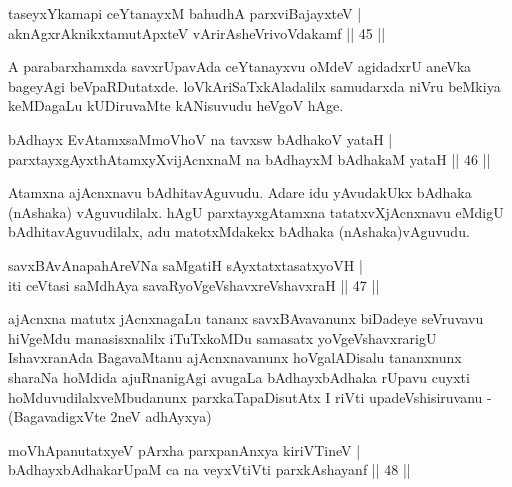 \begin{shl}
taseyxYkamapi ceYtanayxM bahudhA parxviBajayxteV |\\
aknAgxrAknikxtamutApxteV vArirAsheVrivoVdakamf \hfill || 45 ||
\end{shl}

\begin{artha}
A parabarxhamxda savxrUpavAda ceYtanayxvu oMdeV agidadxrU aneVka bageyAgi beVpaRDutatxde. loVkAriSaTxkAladalilx samudarxda niVru beMkiya keMDagaLu kUDiruvaMte kANisuvudu heVgoV hAge.
\end{artha}


\begin{shl}
bAdhayx EvA\s \s tamxsaMmoVhoV na tavxsw bAdhakoV yataH |\\
parxtayxgAyxthAtamxyXvijAcnxnaM na bAdhayxM bAdhakaM yataH \hfill || 46 ||
\end{shl}

\begin{artha}
Atamxna ajAcnxnavu bAdhitavAguvudu. Adare idu yAvudakUkx bAdhaka (nAshaka) vAguvudilalx. hAgU parxtayxgAtamxna tatatxvXjAcnxnavu eMdigU bAdhitavAguvudilalx, adu matotxMdakekx bAdhaka (nAshaka)vAguvudu.
\end{artha}

\begin{shl}
savxBAvAnapahAreVNa saMgatiH sAyxtatxtasatxyoVH |\\
iti ceVtasi saMdhAya savaRyoVgeVshavxreVshavxraH \hfill || 47 ||
\end{shl}

\begin{artha}
ajAcnxna matutx jAcnxnagaLu tananx savxBAvavanunx biDadeye seVruvavu hiVgeMdu manasisxnalilx iTuTxkoMDu samasatx yoVgeVshavxrarigU IshavxranAda BagavaMtanu ajAcnxnavanunx hoVgalADisalu tananxnunx sharaNa hoMdida ajuRnanigAgi avugaLa bAdhayxbAdhaka rUpavu cuyxti hoMduvudilalxveMbudanunx parxkaTapaDisutAtx I riVti upadeVshisiruvanu -(BagavadigxVte 2neV adhAyxya)
\end{artha}

	
\begin{shl}
moVhApanutatxyeV pArxha parxpanAnxya kiriVTineV |\\
bAdhayxbAdhakarUpaM ca na veyxVtiVti parxkAshayanf \hfill || 48 ||
\end{shl}

